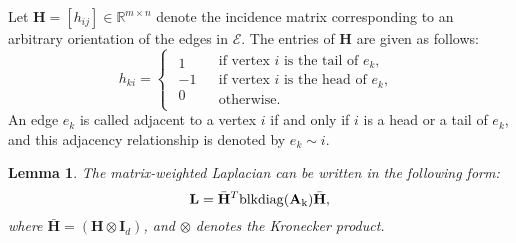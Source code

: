 \documentclass[draftclsnofoot,11pt,onecolumn]{IEEEtran}
\newtheorem{Lemma}{Lemma}
\newcommand{\m}[1]{\mathbf{#1}}
\newcommand{\mc}[1]{\mathcal{#1}}
\newcommand{\mb}[1]{\mathbb{#1}}
\begin{document}
Let $\m{H} =[h_{ij}] \in \mb{R}^{m \times n}$ denote the incidence matrix corresponding to an arbitrary orientation of the edges in $\mc{E}$. The entries of $\m{H}$ are given as follows:
\[{ {h}_{ki}} = \left\{ {\begin{array}{*{20}{c}}
{\begin{array}{*{20}{c}}
1\\
{ - 1}\\
0
\end{array}}&{\begin{array}{*{20}{l}}
{ \text{if vertex $i$ is the tail of } e_{k},}\\
{ \text{if vertex $i$ is the head of } e_{k},}\\
{\text{otherwise.}}
\end{array}}
\end{array}} \right.\]
An edge $e_k$ is called adjacent to a vertex $i$ if and only if $i$ is a head or a tail of $e_k$, and this adjacency relationship is denoted by $e_k \sim i$.

\begin{Lemma}\label{lem:laplacian_incidence} The matrix-weighted Laplacian can be written in the following form:
\begin{equation} \label{eq:laplacian_incidence}
\m{L} = \bar{\m{H}}^T \rm{blkdiag} (\m{A}_{k}) \bar{\m{H}},
\end{equation}
where $\bar{\m{H}} = (\m{H}\otimes \m{I}_d)$, and $\otimes$ denotes the Kronecker product.
\end{Lemma}
\end{document}
